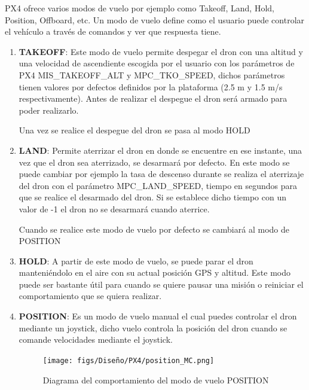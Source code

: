 PX4 ofrece varios modos de vuelo por ejemplo como Takeoff, Land, Hold, Position, Offboard, etc. Un modo de vuelo define como el usuario puede controlar el vehículo a través de comandos
  y ver que respuesta tiene. 


  \begin{enumerate}
    \item \textbf{TAKEOFF}: Este modo de vuelo permite despegar el dron con una altitud y una velocidad de ascendiente escogida por el usuario con los parámetros de PX4 MIS\_TAKEOFF\_ALT y
    MPC\_TKO\_SPEED, dichos parámetros tienen valores por defectos definidos por la plataforma (2.5 m y 1.5 m/s respectivamente). Antes de realizar el despegue el dron será armado 
    para poder realizarlo.

    Una vez se realice el despegue del dron se pasa al modo HOLD 
    \item \textbf{LAND}: Permite aterrizar el dron en donde se encuentre en ese instante, una vez que el dron sea aterrizado, se desarmará por defecto. En este modo se puede cambiar por ejemplo
    la tasa de descenso durante se realiza el aterrizaje del dron con el parámetro MPC\_LAND\_SPEED, tiempo en segundos para que se realice el desarmado del dron. Si se establece dicho tiempo
    con un valor de -1 el dron no se desarmará cuando aterrice.
    
    Cuando se realice este modo de vuelo por defecto se cambiará al modo de POSITION

    \item \textbf{HOLD}: A partir de este modo de vuelo, se puede parar el dron manteniéndolo en el aire con su actual posición GPS y altitud. Este modo puede ser bastante útil para cuando se quiere
    pausar una misión o reiniciar el comportamiento que se quiera realizar. 

    \item \textbf{POSITION}: Es un modo de vuelo manual el cual puedes controlar el dron mediante un joystick, dicho vuelo controla la posición del dron cuando se comande velocidades 
    mediante el joystick.

    \begin{figure} [H]
      \begin{center}
        \texttt{[image: figs/Diseño/PX4/position\_MC.png]}
      \end{center}
      \caption{Diagrama del comportamiento del modo de vuelo POSITION}
      \label{fig:position_mode_px4}
      \vspace{-1.5em}
    \end{figure}


\end{enumerate}
